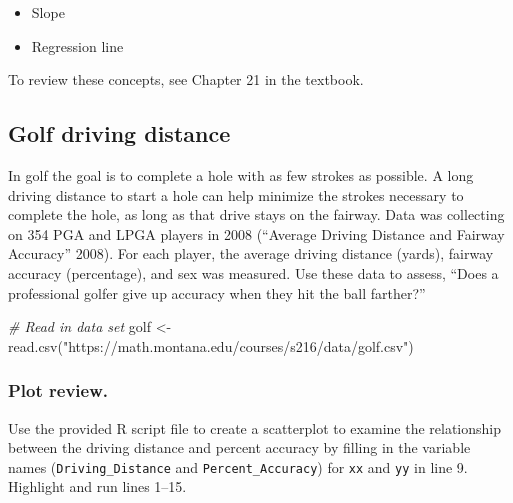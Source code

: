 \documentclass[
]{report}
\newenvironment{Shaded}{\begin{snugshade}}{\end{snugshade}}
\newcommand{\CommentTok}[1]{\textcolor[rgb]{0.56,0.35,0.01}{\textit{#1}}}
\newcommand{\FunctionTok}[1]{\textcolor[rgb]{0.00,0.00,0.00}{#1}}
\newcommand{\NormalTok}[1]{#1}
\newcommand{\OtherTok}[1]{\textcolor[rgb]{0.56,0.35,0.01}{#1}}
\newcommand{\StringTok}[1]{\textcolor[rgb]{0.31,0.60,0.02}{#1}}
\begin{document}
\begin{itemize}
\item
  Slope
\item
  Regression line
\end{itemize}

To review these concepts, see Chapter 21 in the textbook.

\hypertarget{golf-driving-distance}{%
\subsection{Golf driving distance}\label{golf-driving-distance}}

In golf the goal is to complete a hole with as few strokes as possible. A long driving distance to start a hole can help minimize the strokes necessary to complete the hole, as long as that drive stays on the fairway. Data was collecting on 354 PGA and LPGA players in 2008 ({``Average Driving Distance and Fairway Accuracy''} 2008). For each player, the average driving distance (yards), fairway accuracy (percentage), and sex was measured. Use these data to assess, ``Does a professional golfer give up accuracy when they hit the ball farther?''

\begin{Shaded}
\begin{Highlighting}[]
\CommentTok{\# Read in data set}
\NormalTok{golf }\OtherTok{\textless{}{-}} \FunctionTok{read.csv}\NormalTok{(}\StringTok{"https://math.montana.edu/courses/s216/data/golf.csv"}\NormalTok{)}
\end{Highlighting}
\end{Shaded}

\hypertarget{plot-review.}{%
\subsubsection*{Plot review.}\label{plot-review.}}

Use the provided R script file to create a scatterplot to examine the relationship between the driving distance and percent accuracy by filling in the variable names (\texttt{Driving\_Distance} and \texttt{Percent\_Accuracy}) for \texttt{xx} and \texttt{yy} in line 9. Highlight and run lines 1--15.
\end{document}
